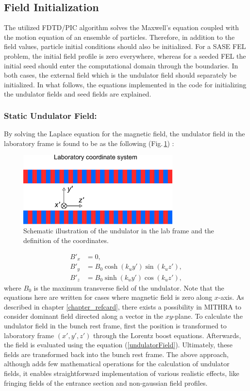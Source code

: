 \subsection{Field Initialization}
\label{fieldInitialization}

The utilized FDTD/PIC algorithm solves the Maxwell's equation coupled with the motion equation of an ensemble of particles.
%
Therefore, in addition to the field values, particle initial conditions should also be initialized.
%
For a SASE FEL problem, the initial field profile is zero everywhere, whereas for a seeded FEL the initial seed should enter the computational domain through the boundaries.
%
In both cases, the external field which is the undulator field should separately be initialized.
%
In what follows, the equations implemented in the code for initializing the undulator fields and seed fields are explained.

\subsubsection{Static Undulator Field:}

By solving the Laplace equation for the magnetic field, the undulator field in the laboratory frame is found to be as the following (Fig.\,\ref{FDTDPICFig3}) \cite{FEL2}:
%
\begin{figure}
\centering
\includegraphics[width=3.2in]{./MITHRA_FDTDPIC/Fig3/Fig3.pdf}
\caption{Schematic illustration of the undulator in the lab frame and the definition of the coordinates.}
\label{FDTDPICFig3}
\end{figure}
%
\begin{align}
\label{undulatorField}
B'_x & = 0, \nonumber \\
B'_y & = B_0 \cosh(k_uy')\sin(k_uz'), \\
B'_z & = B_0 \sinh(k_uy')\cos(k_uz'), \nonumber
\end{align}
%
where $B_0$ is the maximum transverse field of the undulator.
%
Note that the equations here are written for cases where magnetic field is zero along $x$-axis.
%
As described in chapter \ref{chapter_refcard}, there exists a possibility in MITHRA to consider dominant field directed along a vector in the $xy$-plane.
%
To calculate the undulator field in the bunch rest frame, first the position is transformed to laboratory frame $(x',y',z')$ through the Lorentz boost equations.
%
Afterwards, the field is evaluated using the equation (\ref{undulatorField}).
%
Ultimately, these fields are transformed back into the bunch rest frame.
%
The above approach, although adds few mathematical operations for the calculation of undulator fields, it enables straightforward implementation of various realistic effects, like fringing fields of the entrance section and non-gaussian field profiles.

